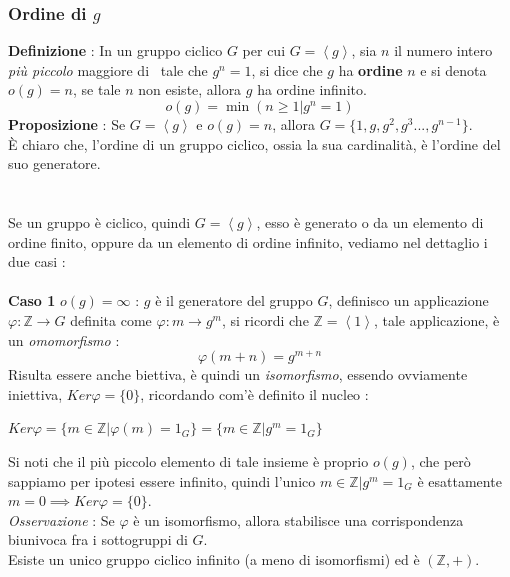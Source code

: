 \documentclass[12pt, letterpaper]{article}
\begin{document}
\subsubsection{Ordine di \(g\)}
\textbf{Definizione }: In un gruppo ciclico \(G\) per cui \(G=\left\langle g\right\rangle\),
sia \(n\) il numero intero \textit{più piccolo} maggiore di \ tale che \(g^n=1\), si dice 
che \(g\) ha \textbf{ordine} \(n\) e si denota \(o(g)=n\), se tale \(n\) non esiste, allora \(g\) ha ordine infinito.
\begin{equation}
    o(g)=\min(n\ge 1|g^n=1)
\end{equation}
\textbf{Proposizione }: Se \(G=\left\langle g\right\rangle\) e \(o(g)=n\), allora 
\(G=\{1,g,g^2,g^3...,g^{n-1}\}\). \\
È chiaro che, l'ordine di un gruppo ciclico, ossia la sua cardinalità, è l'ordine del suo generatore.
\\\hphantom{}\\\hphantom{}\\
Se un gruppo è ciclico, quindi \(G=\left\langle g\right\rangle\), esso è generato 
o da un elemento di ordine finito, oppure da un elemento di ordine infinito, vediamo nel 
dettaglio i due casi :\\\hphantom{}\\
\textbf{Caso 1 }\( o(g)=\infty\) : \(g\) è il generatore del gruppo \(G\), definisco un applicazione 
\(\varphi : \mathbb{Z}\rightarrow G\) definita come \(\varphi : m \rightarrow g^m\), 
si ricordi che \(\mathbb{Z}=\left\langle1\right\rangle\), tale applicazione, 
è un \textit{omomorfismo} : \begin{equation}
    \varphi(m+n)=g^{m+n}
\end{equation}
Risulta essere anche biettiva, è quindi un \textit{isomorfismo}, essendo 
ovviamente iniettiva, \(Ker\varphi = \{0\}\), ricordando com'è definito 
il nucleo :
\begin{center} \(Ker\varphi = \{m\in \mathbb{Z}|\varphi(m)=1_G\}=\{m\in \mathbb{Z}|g^m=1_G\}\)\end{center} Si noti che il più piccolo 
elemento di tale insieme è proprio \(o(g)\), che però sappiamo per ipotesi 
essere infinito, quindi l'unico  \(m\in \mathbb{Z}|g^m=1_G\) è 
esattamente \(m=0\implies Ker\varphi = \{0\}\).\\
\textit{Osservazione }: Se \(\varphi\) è un isomorfismo, allora stabilisce una 
corrispondenza biunivoca fra i sottogruppi di \(G\).\\
Esiste un unico gruppo ciclico infinito (a meno di isomorfismi) ed è \((\mathbb{Z},+)\).
\end{document}
